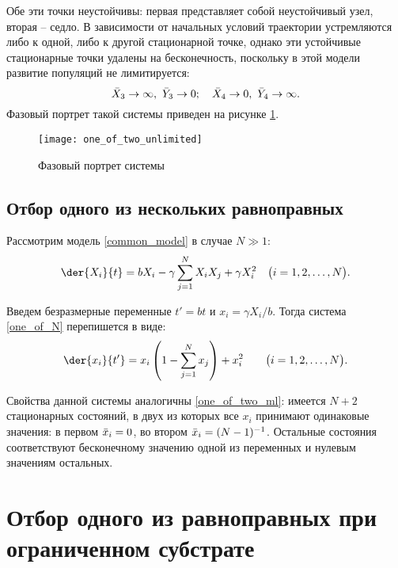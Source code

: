 Обе эти точки неустойчивы: первая представляет собой неустойчивый узел, вторая
-- седло. В зависимости от начальных условий траектории устремляются либо к
одной, либо к другой стационарной точке, однако эти устойчивые стационарные
точки удалены на бесконечность, поскольку в этой модели развитие популяций не
лимитируется:
\[
    \bar{X}_3\to\infty,\ \bar{Y}_3 \to 0; \quad \bar{X}_4 \to 0,\ \bar{Y}_4\to\infty.
\]
Фазовый портрет такой системы приведен на рисунке \ref{phase_one_of_two}.

\begin{figure}[h!]
    \centering
    \texttt{[image: one\_of\_two\_unlimited]}
    \caption{Фазовый портрет системы}
    \label{phase_one_of_two}
\end{figure}

\vspace*{1em} %
\subsection{Отбор одного из нескольких равноправных}

Рассмотрим модель \eqref{common_model} в случае \( N \gg 1 \):
\begin{equation}
    \der{X_i}{t} = bX_i - \gamma\sum_{j = 1}^N X_i X_j + \gamma X_i^2 \quad
    \bigr(i = 1, 2, \ldots, N\bigl).
    \label{one_of_N}
\end{equation}

Введем безразмерные переменные \( t' = bt \) и \( x_i = \gamma X_i/b \). Тогда
система \eqref{one_of_N} перепишется в виде:
\begin{equation}
    \der{x_i}{t'} = x_i\left( 1 - \sum_{j = 1}^N x_j \right) + x_i^2 \qquad
    \bigl(i = 1, 2, \ldots, N\bigr).
    \label{one_of_N_ml}
\end{equation}

Свойства данной системы аналогичны \eqref{one_of_two_ml}: имеется \( N + 2 \)
стационарных состояний, в двух из которых все \( x_i \) принимают одинаковые
значения: в первом \( \bar{x}_i = 0 \), во втором \( \bar{x}_i = (N - 1)^{-1} \).
Остальные состояния соответствуют бесконечному значению одной из переменных и
нулевым значениям остальных.

\vspace*{2em} %
\section{Отбор одного из равноправных при ограниченном субстрате}

